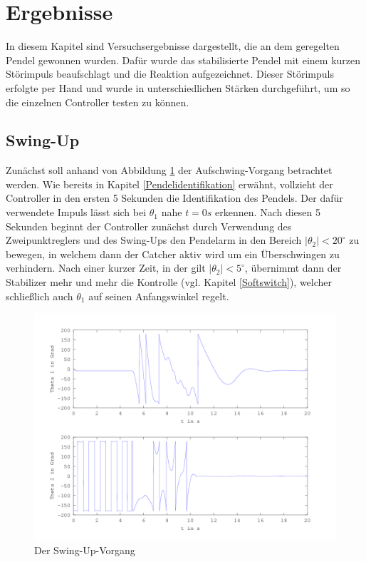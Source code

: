 \section{Ergebnisse}
In diesem Kapitel sind Versuchsergebnisse dargestellt, die an dem geregelten Pendel gewonnen wurden. Dafür wurde das stabilisierte Pendel mit einem kurzen Störimpuls beaufschlagt und die Reaktion aufgezeichnet. Dieser Störimpuls erfolgte per Hand und wurde in unterschiedlichen Stärken durchgeführt, um so die einzelnen Controller testen zu können. 
\subsection{Swing-Up}
Zunächst soll anhand von Abbildung \ref{fig.Swing-Up-Plot} der Aufschwing-Vorgang betrachtet werden. Wie bereits in Kapitel \ref{Pendelidentifikation} erwähnt, vollzieht der Controller in den ersten 5 Sekunden die Identifikation des Pendels. Der dafür verwendete Impuls lässt sich bei $\theta_1$ nahe $t=0s$ erkennen. Nach diesen 5 Sekunden beginnt der Controller zunächst durch Verwendung des Zweipunktreglers und des Swing-Ups den Pendelarm in den Bereich $\left| \theta_2 \right| < 20^\circ$ zu bewegen, in welchem dann der Catcher aktiv wird um ein Überschwingen zu verhindern. Nach einer kurzer Zeit, in der gilt $\left| \theta_2 \right| < 5^\circ$, übernimmt dann der Stabilizer mehr und mehr die Kontrolle (vgl. Kapitel \ref{Softswitch}), welcher schließlich auch $\theta_1$ auf seinen Anfangswinkel regelt.
\begin{figure}[htbp]
	\label{fig.Swing-Up-Plot}
	\centering
	\includegraphics[width=1.\textwidth]{Grafiken/Swingup_kurz.png}
	\caption{Der Swing-Up-Vorgang}
\end{figure}



